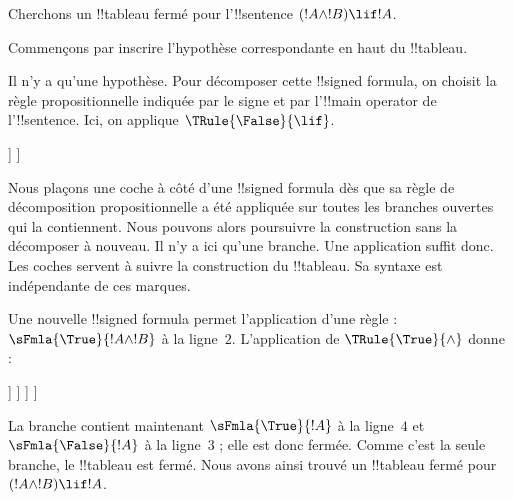 \documentclass[../../../include/open-logic-section]{subfiles}
\begin{document}
      {}
      {}


\begin{ex}
Cherchons un !!{tableau} fermé pour l'!!{sentence}
$(!A \land !B) \lif !A$.

Commençons par inscrire l'hypothèse correspondante en haut du
!!{tableau}.
\begin{oltableau}
  [\sFmla{\False}{(\formula{A} \land \formula{B}) \lif \formula{A}},
    just = \TAss]
\end{oltableau}

Il n'y a qu'une hypothèse. Pour décomposer cette !!{signed formula},
on choisit la règle propositionnelle indiquée par le signe et par
l'!!{main operator} de l'!!{sentence}. Ici, on applique
$\TRule{\False}{\lif}$.
%
\begin{oltableau}
  [\sFmla{\False}{(\formula{A} \land \formula{B}) \lif \formula{A}},
    checked, just = \TAss
    [\sFmla{\True}{\formula{A} \land \formula{B}},
      just={\TRule{\False}{\lif}[1]}
      [\sFmla{\False}{\formula{A}}, just={\TRule{\False}{\lif}[1]}]
    ]
  ]
\end{oltableau}
Nous plaçons une coche à côté d'une !!{signed formula} dès que
sa règle de décomposition propositionnelle a été appliquée sur
toutes les branches ouvertes qui la contiennent. Nous pouvons
alors poursuivre la construction sans la décomposer à nouveau.
Il n'y a ici qu'une branche. Une application suffit donc.
Les coches servent à suivre la construction du !!{tableau}.
Sa syntaxe est indépendante de ces marques.
%
%

Une nouvelle !!{signed formula} permet l'application d'une règle :
$\sFmla{\True}{!A \land !B}$ à la ligne~$2$. L'application de
$\TRule{\True}{\land}$ donne :
\begin{oltableau}
  [\sFmla{\False}{(\formula{A} \land \formula{B}) \lif \formula{A}},
    checked, just = \TAss
    [\sFmla{\True}{\formula{A} \land \formula{B}},
      just={\TRule{\False}{\lif}[1]}, checked
      [\sFmla{\False}{\formula{A}}, just={\TRule{\False}{\lif}[1]}
        [\sFmla{\True}{\formula{A}}, just={\TRule{\True}{\land}[2]}
          [\sFmla{\True}{\formula{B}}, just={\TRule{\True}{\land}[2]}, close
          ]
        ]
      ]
    ]
  ]
\end{oltableau}
La branche contient maintenant $\sFmla{\True}{!A}$ à la ligne~$4$ et
$\sFmla{\False}{!A}$ à la ligne~$3$ ; elle est donc fermée. Comme c'est
la seule branche, le !!{tableau} est fermé. Nous avons ainsi trouvé un
!!{tableau} fermé pour~$(!A \land !B) \lif !A$.
\end{ex}
\end{document}
